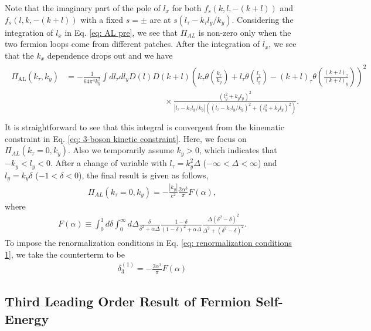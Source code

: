 \documentclass[prx,amsmath,amssymb, notitlepage, onecolumn,
nofootinbib,
superscriptaddress,
longbibliography
]{revtex4-1}
\newcommand{\beq}{\begin{eqnarray}}
\newcommand{\eeq}{\end{eqnarray}}
\begin{document}
%
Note that the imaginary part of the pole of $l_x$ for both $f_s(k, l, - (k+l))$ and $f_s(l, k, -(k+l))$ with a fixed $s=\pm$ are at $s(l_\tau - k_\tau l_y/k_y)$. Considering the integration of $l_x$ in Eq. \eqref{eq: AL pre}, we see that $\Pi_{AL}$ is non-zero only when the two fermion loops come from different patches. 
After the integration of $l_x$, we see that the $k_x$ dependence drops out and we have
\beq
\begin{split}
\Pi_{\text{AL}}(k_\tau, k_y) 
&= -\frac{1}{64\pi^4 k_y^2} \int d l_\tau d l_y D(l) D(k+l) \left(k_\tau  \theta\left(\frac{k_\tau }{k_y}\right) + l_\tau \theta\left(\frac{l_\tau}{l_y}\right) - (k+l)_\tau \theta\left(\frac{(k+l)_\tau}{(k+l)_y}\right)\right)^2\\ &  \quad\quad\quad\quad\quad\quad\quad\quad\quad\quad\quad\quad 
\times \frac{\left(l_y^2+k_y l_y\right)^2}{|l_\tau-k_\tau l_y/k_y|\left(\left(l_\tau-k_\tau l_y/k_y\right)^2 + \left(l_y^2+k_y l_y\right)^2\right)}.\\
\end{split}
\eeq
It is straightforward to see that this integral is convergent from the kinematic constraint in Eq. \eqref{eq: 3-boson kinetic constraint}.
Here, we focus on 
$\Pi_{AL}(k_\tau=0, k_y)$. 
Also we temporarily assume $k_y>0$, which indicates that $-k_y<l_y<0$. 
After a change of variable with $l_\tau = k_y^2\Delta$ ($-\infty<\Delta<\infty$) and $l_y = k_y \delta$ ($-1<\delta<0$), the final result is given as follows,
\beq\label{eq: N^0 photon propagator}
\Pi_{AL}(k_\tau = 0, k_y) = -\frac{|k_y|}{e^2}\frac{2\alpha^3}{\pi}F(\alpha), 
\eeq
where
\beq\label{eq: def of F}
F(\alpha) \equiv \int_0^1 d \delta \int_0^\infty d\Delta \frac{\delta}{\delta^2+\alpha\Delta}\frac{1-\delta}{(1-\delta)^2+\alpha\Delta}\frac{\Delta\left(\delta^2-\delta\right)^2}{\Delta^2+\left(\delta^2-\delta\right)^2}.
\eeq
To impose the renormalization conditions in Eq. \eqref{eq: renormalization conditions 1}, 
we take the counterterm to be
\beq
\delta_3^{(1)}=-\frac{2\alpha^3}{\pi}F(\alpha)
\eeq


\subsection{Third Leading Order Result of Fermion Self-Energy}\label{subapp: fermion}
\end{document}
